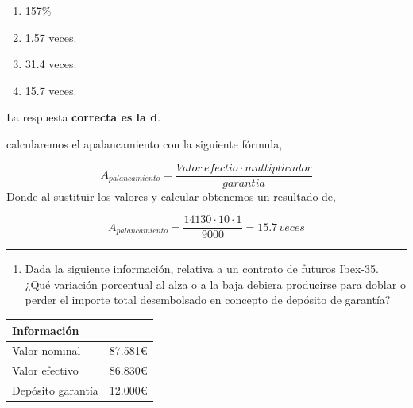 \documentclass[
  letterpaper,
  DIV=11,
  numbers=noendperiod]{scrreprt}
\providecommand{\tightlist}{%
  \setlength{\itemsep}{0pt}\setlength{\parskip}{0pt}}\usepackage{longtable,booktabs,array}
\begin{document}
\begin{enumerate}
\def\labelenumi{\alph{enumi})}
\item
  157\%
\item
  1.57 veces.
\item
  31.4 veces.
\item
  15.7 veces.
\end{enumerate}

\begin{tcolorbox}[enhanced jigsaw, left=2mm, opacityback=0, colback=white, breakable, arc=.35mm, bottomrule=.15mm, rightrule=.15mm, toprule=.15mm, leftrule=.75mm, colframe=quarto-callout-tip-color-frame]
\begin{minipage}[t]{5.5mm}
\textcolor{quarto-callout-tip-color}{\faLightbulb}
\end{minipage}%
\begin{minipage}[t]{\textwidth - 5.5mm}

La respuesta \textbf{correcta es la d}.

calcularemos el apalancamiento con la siguiente fórmula,

\[A_{palancamiento}=\frac{Valor\,efectio\cdot multiplicador}{garantia}\]
Donde al sustituir los valores y calcular obtenemos un resultado de,

\[A_{palancamiento}=\frac{14130\cdot10 \cdot 1}{9000}=15.7\,veces\]

\end{minipage}%
\end{tcolorbox}

\begin{center}\rule{0.5\linewidth}{0.5pt}\end{center}

\begin{enumerate}
\def\labelenumi{\arabic{enumi}.}
\setcounter{enumi}{71}
\tightlist
\item
  Dada la siguiente información, relativa a un contrato de futuros
  Ibex-35. ¿Qué variación porcentual al alza o a la baja debiera
  producirse para doblar o perder el importe total desembolsado en
  concepto de depósito de garantía?
\end{enumerate}

\begin{longtable}[]{@{}ll@{}}
\toprule()
Información & \\
\midrule()
\endhead
Valor nominal & 87.581€ \\
Valor efectivo & 86.830€ \\
Depósito garantía & 12.000€ \\
\bottomrule()
\end{longtable}
\end{document}
